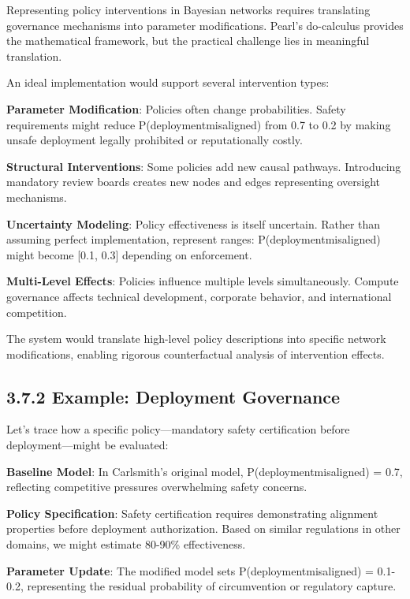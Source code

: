 \documentclass[
  11pt,
  letterpaper,
  openany]{book}
\begin{document}
Representing policy interventions in Bayesian networks requires
translating governance mechanisms into parameter modifications. Pearl's
do-calculus provides the mathematical framework, but the practical
challenge lies in meaningful translation.

An ideal implementation would support several intervention types:

\textbf{Parameter Modification}: Policies often change probabilities.
Safety requirements might reduce P(deployment\textbar misaligned) from
0.7 to 0.2 by making unsafe deployment legally prohibited or
reputationally costly.

\textbf{Structural Interventions}: Some policies add new causal
pathways. Introducing mandatory review boards creates new nodes and
edges representing oversight mechanisms.

\textbf{Uncertainty Modeling}: Policy effectiveness is itself uncertain.
Rather than assuming perfect implementation, represent ranges:
P(deployment\textbar misaligned) might become {[}0.1, 0.3{]} depending
on enforcement.

\textbf{Multi-Level Effects}: Policies influence multiple levels
simultaneously. Compute governance affects technical development,
corporate behavior, and international competition.

The system would translate high-level policy descriptions into specific
network modifications, enabling rigorous counterfactual analysis of
intervention effects.

\subsection{3.7.2 Example: Deployment
Governance}\label{sec-deployment-example}

Let's trace how a specific policy---mandatory safety certification
before deployment---might be evaluated:

\textbf{Baseline Model}: In Carlsmith's original model,
P(deployment\textbar misaligned) = 0.7, reflecting competitive pressures
overwhelming safety concerns.

\textbf{Policy Specification}: Safety certification requires
demonstrating alignment properties before deployment authorization.
Based on similar regulations in other domains, we might estimate 80-90\%
effectiveness.

\textbf{Parameter Update}: The modified model sets
P(deployment\textbar misaligned) = 0.1-0.2, representing the residual
probability of circumvention or regulatory capture.
\end{document}
